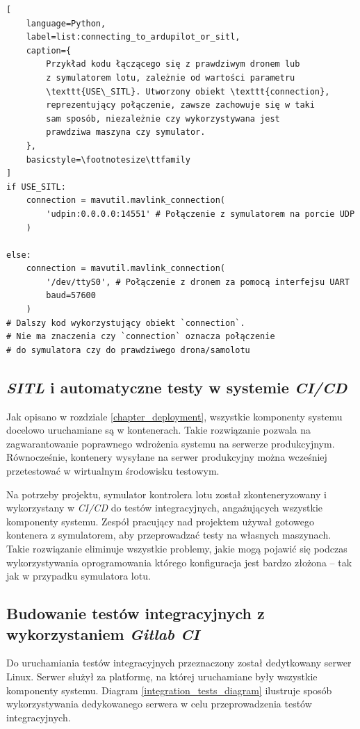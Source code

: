 \begin{lstlisting}[
    language=Python,
    label=list:connecting_to_ardupilot_or_sitl,
    caption={
        Przykład kodu łączącego się z prawdziwym dronem lub 
        z symulatorem lotu, zależnie od wartości parametru
        \texttt{USE\_SITL}. Utworzony obiekt \texttt{connection},
        reprezentujący połączenie, zawsze zachowuje się w taki
        sam sposób, niezależnie czy wykorzystywana jest
        prawdziwa maszyna czy symulator. 
    },
    basicstyle=\footnotesize\ttfamily
]
if USE_SITL:
    connection = mavutil.mavlink_connection(
        'udpin:0.0.0.0:14551' # Połączenie z symulatorem na porcie UDP
    )

else:    
    connection = mavutil.mavlink_connection(
        '/dev/ttyS0', # Połączenie z dronem za pomocą interfejsu UART
        baud=57600
    )
# Dalszy kod wykorzystujący obiekt `connection`.
# Nie ma znaczenia czy `connection` oznacza połączenie
# do symulatora czy do prawdziwego drona/samolotu
\end{lstlisting}

\subsection{\textit{SITL} i automatyczne testy w systemie \textit{CI/CD}}

Jak opisano w rozdziale \ref{chapter_deployment}, wszystkie komponenty systemu
docelowo uruchamiane są w kontenerach. Takie rozwiązanie pozwala na zagwarantowanie
poprawnego wdrożenia systemu na serwerze produkcyjnym. Równocześnie, kontenery wysyłane
na serwer produkcyjny można wcześniej przetestować w wirtualnym środowisku testowym.

Na potrzeby projektu, symulator kontrolera lotu został zkonteneryzowany i wykorzystany
w \textit{CI/CD} do testów integracyjnych, angażujących wszystkie komponenty systemu.
Zespół pracujący nad projektem używał gotowego kontenera z symulatorem,
aby przeprowadzać testy na własnych maszynach. Takie rozwiązanie eliminuje wszystkie
problemy, jakie mogą pojawić się podczas wykorzystywania oprogramowania którego
konfiguracja jest bardzo złożona -- tak jak w przypadku symulatora lotu.

\subsection{Budowanie testów integracyjnych z wykorzystaniem \textit{Gitlab CI}}

Do uruchamiania testów integracyjnych przeznaczony został dedytkowany serwer
Linux. Serwer służył za platformę, na której uruchamiane były wszystkie 
komponenty systemu. Diagram \ref{integration_tests_diagram} ilustruje 
sposób wykorzystywania dedykowanego serwera w celu przeprowadzenia 
testów integracyjnych.

